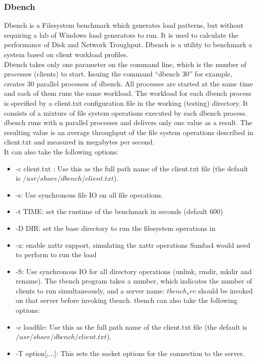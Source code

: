 \documentclass[10pt, conference]{IEEEtran}
\begin{document}
\subsubsection{Dbench}
\indent Dbench is a Filesystem benchmark which generates load patterns, but without requiring a lab of Windows load generators to run. It is used to calculate the performance of Disk and Network Troughput. Dbench is a utility to benchmark a system based on client workload profiles.\\
\indent Dbench takes only one parameter on the command line, which is the number of processes (clients) to start. Issuing the command “dbench 30” for example, creates 30 parallel processes of dbench. All processes are started at the same time and each of them runs the same workload. The workload for each dbench process is specified by a client.txt configuration file in the working (testing) directory. It consists of a mixture of file system operations executed by each dbench process. dbench runs with n parallel processes and delivers only one value as a result. The resulting value is an average throughput of the file system operations described in client.txt and measured in megabytes per second.\\
\indent It can also take the following options:\\

\begin{itemize}
\item -c client.txt : Use this as the full path name of the client.txt file (the default is $/usr/share/dbench/client.txt$).
\item -s: Use synchronous file IO on all file operations.
\item -t TIME: set the runtime of the benchmark in seconds (default 600)
\item -D DIR: set the base directory to run the filesystem operations in
\item -x: enable xattr support, simulating the xattr operations Samba4 would need to perform to run the load
\item -S: Use synchronous IO for all directory operations (unlink, rmdir, mkdir and rename). The tbench program takes a number, which indicates the number of clients to run simultaneously,  and a server name: $tbench_srv$ should be invoked on that server before invoking tbench. tbench can also take the following options:
\item -c loadfile: Use this as the full path name of the client.txt file (the default is $/usr/share/dbench/client.txt$).
\item -T option[,...]: This sets the socket options for the connection to the server. 
\end{itemize}
\end{document}
